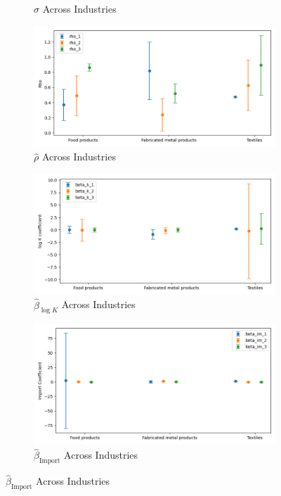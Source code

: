 \documentclass{article}
\begin{document}
\begin{figure}[ht!]
\begin{subfigure}[t]{0.32\textwidth}
        \caption{$\hat\sigma$ Across Industries}
    \end{subfigure}
    \begin{subfigure}[t]{0.32\textwidth}
        \centering
        \includegraphics[width=\textwidth]{figure/ar1_normal_kmshare_ciiu_rho_across_industries_m3.png}
        \caption{$\hat\rho$ Across Industries}
    \end{subfigure}
    \begin{subfigure}[t]{0.32\textwidth}
        \centering
        \includegraphics[width=\textwidth]{figure/ar1_normal_kmshare_ciiu_beta_k_across_industries_m3.png}
        \caption{$\hat{\beta}_{\log K}$ Across Industries}
    \end{subfigure}
    \begin{subfigure}[t]{0.32\textwidth}
        \centering
        \includegraphics[width=\textwidth]{figure/ar1_normal_kmshare_ciiu_beta_im_across_industries_m3.png}
        \caption{$\hat{\beta}_{\text{Import}}$ Across Industries}
    \end{subfigure}
\end{figure}
\end{document}
